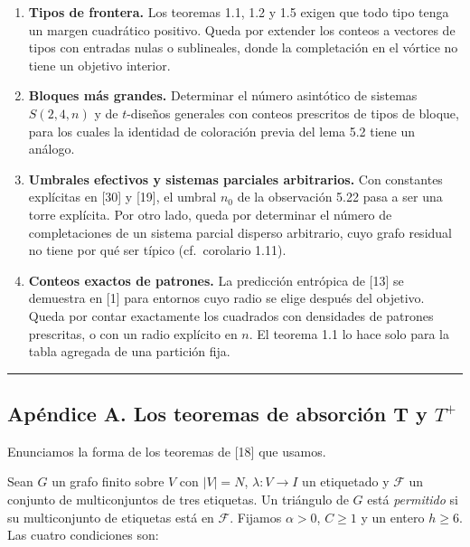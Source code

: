 \documentclass[spanish,11pt,a4paper]{article}
\providecommand{\tightlist}{\setlength{\itemsep}{0pt}\setlength{\parskip}{0pt}}
\begin{document}
\begin{enumerate}
\def\labelenumi{\arabic{enumi}.}
\tightlist
\item
  \textbf{Tipos de frontera.} Los teoremas 1.1, 1.2 y 1.5 exigen que todo tipo tenga un margen cuadrático positivo. Queda por extender los conteos a vectores de tipos con entradas nulas o sublineales, donde la completación en el vórtice no tiene un objetivo interior.
\item
  \textbf{Bloques más grandes.} Determinar el número asintótico de sistemas \(S(2,4,n)\) y de \(t\)-diseños generales con conteos prescritos de tipos de bloque, para los cuales la identidad de coloración previa del lema 5.2 tiene un análogo.
\item
  \textbf{Umbrales efectivos y sistemas parciales arbitrarios.} Con constantes explícitas en {[}30{]} y {[}19{]}, el umbral \(n_0\) de la observación 5.22 pasa a ser una torre explícita. Por otro lado, queda por determinar el número de completaciones de un sistema parcial disperso arbitrario, cuyo grafo residual no tiene por qué ser típico (cf.~corolario 1.11).
\item
  \textbf{Conteos exactos de patrones.} La predicción entrópica de {[}13{]} se demuestra en {[}1{]} para entornos cuyo radio se elige después del objetivo. Queda por contar exactamente los cuadrados con densidades de patrones prescritas, o con un radio explícito en \(n\). El teorema 1.1 lo hace solo para la tabla agregada de una partición fija.
\end{enumerate}

\begin{center}\rule{0.5\linewidth}{0.5pt}\end{center}

\subsection{\texorpdfstring{Apéndice A. Los teoremas de absorción T y \(T^+\)}{Apéndice A. Los teoremas de absorción T y T\^{}+}}\label{apuxe9ndice-a.-los-teoremas-de-absorciuxf3n-t-y-t}

Enunciamos la forma de los teoremas de {[}18{]} que usamos.

Sean \(G\) un grafo finito sobre \(V\) con \(|V|=N\), \(\lambda:V\to I\) un etiquetado y \(\mathcal F\) un conjunto de multiconjuntos de tres etiquetas. Un triángulo de \(G\) está \emph{permitido} si su multiconjunto de etiquetas está en \(\mathcal F\). Fijamos \(\alpha>0\), \(C\ge1\) y un entero \(h\ge6\). Las cuatro condiciones son:
\end{document}
